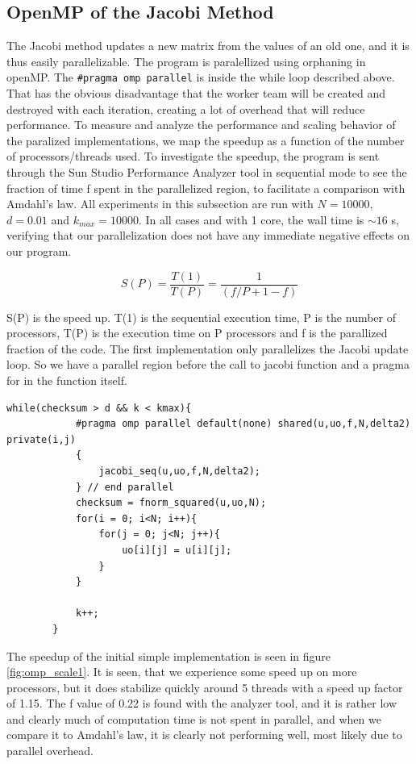 \subsection{OpenMP of the Jacobi Method}
The Jacobi method updates a new matrix from the values of an old one, and it is thus easily parallelizable. The program is paralellized using orphaning in openMP. The \texttt{\#pragma omp parallel} is inside the while loop described above. That has the obvious disadvantage that the worker team will be created and destroyed with each iteration, creating a lot of overhead that will reduce performance. To measure and analyze the performance and scaling behavior of the paralized implementations, we map the speedup as a function of the number of processors/threads used. To investigate the speedup, the program is sent through the Sun Studio Performance Analyzer tool in sequential mode to see the fraction of time f spent in the parallelized region, to facilitate a comparison with Amdahl's law. All experiments in this subsection are run with $N = 10000$, $d = 0.01$ and $k_{max} = 10000$. In all cases and with 1 core, the wall time is $\sim 16$ s, verifying that our parallelization does not have any immediate negative effects on our program.

\begin{equation}
S(P)=\dfrac{T(1)}{T(P)}=\dfrac{1}{(f/P+1-f)}
\end{equation}

S(P) is the speed up. T(1) is the sequential execution time, P is the number of processors, T(P) is the execution time on P processors and f is the parallized fraction of the code. The first implementation only parallelizes the Jacobi update loop. So we have a parallel region before the call to jacobi function and a pragma for in the function itself.

\begin{lstlisting}[caption = While loop of our initial omp program]
while(checksum > d && k < kmax){
			#pragma omp parallel default(none) shared(u,uo,f,N,delta2) private(i,j)
			{
				jacobi_seq(u,uo,f,N,delta2);
			} // end parallel
			checksum = fnorm_squared(u,uo,N);
			for(i = 0; i<N; i++){
				for(j = 0; j<N; j++){
					uo[i][j] = u[i][j];
				}
			} 
			
			k++;
		} 
\end{lstlisting}

The speedup of the initial simple implementation is seen in figure \ref{fig:omp_scale1}. It is seen, that we experience some speed up on more processors, but it does stabilize quickly around 5 threads with a speed up factor of 1.15. The f value of 0.22 is found with the analyzer tool, and it is rather low and clearly much of computation time is not spent in parallel, and when we compare it to Amdahl's law, it is clearly not performing well, most likely due to parallel overhead.


